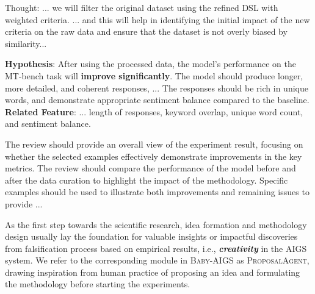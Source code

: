 \documentclass{article} %
\newcommand{\AIGS}{AIGS\xspace}
\newcommand{\AIGSSys}{\textsc{Baby-AIGS}\xspace}
\newcommand{\ProposalAgent}{\textsc{ProposalAgent}\xspace}
\newcommand{\DSL}{\textsc{DSL}\xspace}
\begin{document}
\begin{tcolorbox}
\begin{tcolorbox}[title={Experiment Settings}, colbacktitle=blue!50!white, fonttitle=\bfseries, colback=blue!10!white, boxrule=0pt]
    Thought: ... we will filter the original dataset using the refined \DSL with weighted criteria. ... and this will help in identifying the initial impact of the new criteria on the raw data and ensure that the dataset is not overly biased by similarity...
    \end{tcolorbox}
    \begin{tcolorbox}[title={Hypothesis \& Related Feature}, colbacktitle=blue!50!white, fonttitle=\bfseries, colback=blue!10!white, boxrule=0pt]
    \small
    \textbf{Hypothesis}: After using the processed data, the model's performance on the MT-bench task will \textbf{improve significantly}. The model should produce longer, more detailed, and coherent responses, ... The responses should be rich in unique words, and demonstrate appropriate sentiment balance compared to the baseline.  
    \tcblower
    \small
    \textbf{Related Feature}: ... length of responses, keyword overlap, unique word count, and sentiment balance. 
    \end{tcolorbox}
    \begin{tcolorbox}[title={Rebuttal}, colbacktitle=blue!50!white, fonttitle=\bfseries, colback=blue!10!white, boxrule=0pt]
    \small
    The review should provide an overall view of the experiment result, focusing on whether the selected examples effectively demonstrate improvements in the key metrics. The review should compare the performance of the model before and after the data curation to highlight the impact of the methodology. Specific examples should be used to illustrate both improvements and remaining issues to provide ...
    \end{tcolorbox}
\end{tcolorbox}

\vspace{0.5em}


As the first step towards the scientific research, idea formation and methodology design usually lay the foundation for valuable insights or impactful discoveries from falsification process based on empirical results, i.e., \textbf{\textit{creativity}} in the \AIGS system. We refer to the corresponding module in \AIGSSys as \ProposalAgent, drawing inspiration from human practice of proposing an idea and formulating the methodology before starting the experiments.  
\end{document}
